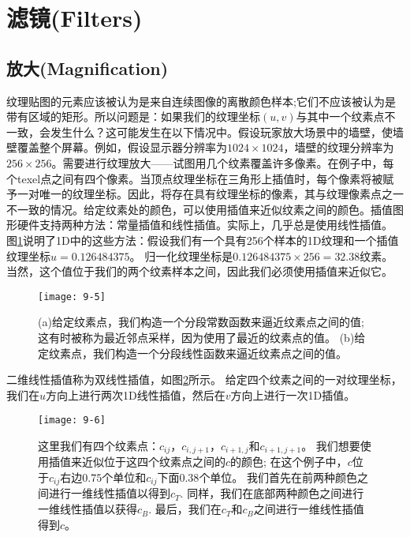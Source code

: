 \section{滤镜(Filters)}
\subsection{放大(Magnification)}
\begin{flushleft}
纹理贴图的元素应该被认为是来自连续图像的离散颜色样本;它们不应该被认为是带有区域的矩形。所以问题是：如果我们的纹理坐标$(u,v)$与其中一个纹素点不一致，会发生什么？这可能发生在以下情况中。假设玩家放大场景中的墙壁，使墙壁覆盖整个屏幕。例如，假设显示器分辨率为$1024\times 1024$，墙壁的纹理分辨率为$256\times 256$。需要进行纹理放大——试图用几个纹素覆盖许多像素。在例子中，每个texel点之间有四个像素。当顶点纹理坐标在三角形上插值时，每个像素将被赋予一对唯一的纹理坐标。因此，将存在具有纹理坐标的像素，其与纹理像素点之一不一致的情况。给定纹素处的颜色，可以使用插值来近似纹素之间的颜色。插值图形硬件支持两种方法：常量插值和线性插值。实际上，几乎总是使用线性插值。\\

图\ref{fig:9-5}说明了1D中的这些方法：假设我们有一个具有256个样本的1D纹理和一个插值纹理坐标$u=0.126484375$。 归一化纹理坐标是$0.126484375\times 256 = 32.38$纹素。 当然，这个值位于我们的两个纹素样本之间，因此我们必须使用插值来近似它。\\
\end{flushleft}

\begin{figure}[h]
    \texttt{[image: 9-5]}
    \centering
    \caption{(a)给定纹素点，我们构造一个分段常数函数来逼近纹素点之间的值; 这有时被称为最近邻点采样，因为使用了最近的纹素点的值。 (b)给定纹素点，我们构造一个分段线性函数来逼近纹素点之间的值。}
    \label{fig:9-5}
\end{figure}

\begin{flushleft}
二维线性插值称为双线性插值，如图\ref{fig:9-6}所示。 给定四个纹素之间的一对纹理坐标，我们在$u$方向上进行两次1D线性插值，然后在$v$方向上进行一次1D插值。
\end{flushleft}

\begin{figure}[h]
    \texttt{[image: 9-6]}
    \centering
    \caption{这里我们有四个纹素点：$c_{ij}$，$c_{i,j+1}$，$c_{i+1,j}$和$c_{i+1,j+1}$。 我们想要使用插值来近似位于这四个纹素点之间的$c$的颜色; 在这个例子中，$c$位于$c_{ij}$右边$0.75$个单位和$c_{ij}$下面$0.38$个单位。 我们首先在前两种颜色之间进行一维线性插值以得到$c_{T}$. 同样，我们在底部两种颜色之间进行一维线性插值以获得$c_{B}$. 最后，我们在$c_{T}$和$c_{B}$之间进行一维线性插值得到$c$。}
    \label{fig:9-6}
\end{figure}


